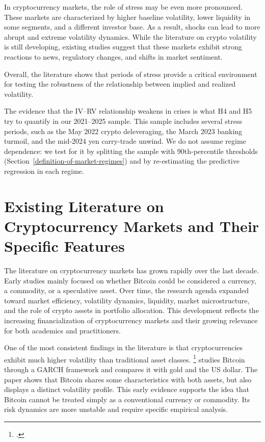 \documentclass[11pt,a4paper,openany]{report}
\newcommand{\fcitet}[1]{\citet{#1}\footnote{\bibentry{#1}.}}
\begin{document}
In cryptocurrency markets, the role of stress may be even more
pronounced. These markets are characterized by higher baseline
volatility, lower liquidity in some segments, and a different investor
base. As a result, shocks can lead to more abrupt and extreme volatility
dynamics. While the literature on crypto volatility is still developing,
existing studies suggest that these markets exhibit strong reactions to
news, regulatory changes, and shifts in market sentiment.

Overall, the literature shows that periods of stress provide a critical
environment for testing the robustness of the relationship between
implied and realized volatility.

The evidence that the IV--RV relationship weakens in crises is what
H4 and H5 try to quantify in our 2021--2025 sample. This sample
includes several stress periods, such as the May 2022 crypto
deleveraging, the March 2023 banking turmoil, and the mid-2024 yen
carry-trade unwind. We do not assume regime dependence: we test for it
by splitting the sample with 90th-percentile thresholds
(Section~\ref{definition-of-market-regimes}) and by re-estimating the
predictive regression in each regime.

\section{Existing Literature on Cryptocurrency Markets and Their
Specific
Features}\label{existing-literature-on-cryptocurrency-markets-and-their-specific-features}

The literature on cryptocurrency markets has grown rapidly over the last
decade. Early studies mainly focused on whether Bitcoin could be
considered a currency, a commodity, or a speculative asset. Over time,
the research agenda expanded toward market efficiency, volatility
dynamics, liquidity, market microstructure, and the role of crypto
assets in portfolio allocation. This development reflects the increasing
financialization of cryptocurrency markets and their growing relevance
for both academics and practitioners.

One of the most consistent findings in the literature is that
cryptocurrencies exhibit much higher volatility than traditional asset
classes. \fcitet{dyhrberg2016} studies Bitcoin through a GARCH framework
and compares it with gold and the US dollar. The paper shows that
Bitcoin shares some characteristics with both assets, but also displays
a distinct volatility profile. This early evidence supports the idea
that Bitcoin cannot be treated simply as a conventional currency or
commodity. Its risk dynamics are more unstable and require specific
empirical analysis.
\end{document}
